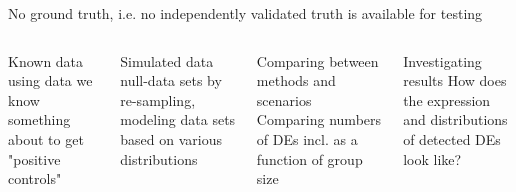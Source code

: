 \documentclass{beamer}\usepackage[]{graphicx}\usepackage[]{color}
\begin{document}
\begin{frame}
No ground truth, i.e. no independently validated truth is available for testing
\vspace{0.5cm}
\begin{columns}
\scriptsize
\begin{block}{Known data}
using data we know something about to get "positive controls"
\end{block} \pause

\begin{block}{Simulated data} 
null-data sets by re-sampling, modeling data sets based on various distributions
\end{block} \pause

\scriptsize
\begin{block}{Comparing between methods and scenarios}
Comparing numbers of DEs incl. as a function of group size 
\end{block} \pause

\begin{block}{Investigating results}
How does the expression and distributions of detected DEs look like?
\end{block}

\end{columns}
\end{frame}

\end{document}
